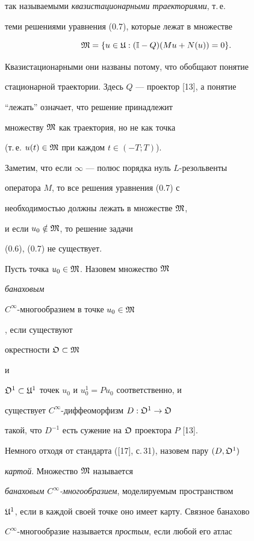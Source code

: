 так называемыми {\it квазистационарными траекториями}, т.\,е.


теми решениями уравнения (0.7), которые лежат в множестве


$$


\frak{M}=\{u \in\frak{U}: (\Bbb{I}-Q)(Mu+N(u))=0\}.


$$


Квазистационарными они названы потому, что обобщают понятие


стационарной траектории. Здесь $Q$ --- проектор [13], а понятие


``лежать'' означает, что решение принадлежит


множеству $\frak{M}$ как траектория, но не как точка


(т.\,е. $u(t) \in \frak{M}$ при каждом $t \in (-T;T)$).


Заметим, что если $\infty$ --- полюс порядка нуль $L$-резольвенты 


оператора $M$, то все решения уравнения (0.7) с


необходимостью должны лежать в множестве $\frak{M}$,


и если $u_0 \notin \frak{M}$, то решение задачи


(0.6), (0.7) не существует.





Пусть точка $u_0 \in \frak{M}$. Назовем множество $\frak{M}$ {\it банаховым


$C^{\infty}$-многообразием в точке $u_0 \in \frak{M}$}, если существуют 


окрестности $\frak{O} \subset \frak{M}$


и


$\frak{O}^1 \subset \frak{U}^1$ точек $u_0$ и $u^1_0=Pu_0$ соответственно, и


существует $C^{\infty}$-диффеоморфизм $D:\frak{O}^1 \rightarrow \frak{O}$ 


такой, что $D^{-1}$ есть сужение на $\frak{O}$ проектора $P$ [13].


Немного отходя от стандарта ([17], с.\,31), назовем пару $(D,\frak{O}^1)$


{\it картой}. Множество $\frak{M}$ называется


{\it банаховым $C^{\infty}$-многообразием}, моделируемым пространством


$\frak{U}^1$, если в каждой своей точке оно имеет карту. Связное банахово


$C^{\infty}$-многообразие называется {\it простым}, если любой его атлас 


